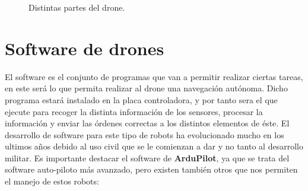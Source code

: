 \begin{figure}[H]
 \centering
 \caption{Distintas partes del drone.}
 \label{f:Test 1}
\end{figure} 


\section{Software de drones}
\hspace{1 cm} El software es el conjunto de programas que van a permitir realizar ciertas tareas, en este ser\'a lo que permita realizar al drone una navegaci\'on aut\'onoma. Dicho programa estar\'a instalado en la placa controladora, y por tanto sera el que ejecute para recoger la distinta informaci\'on de los sensores, procesar la informaci\'on y enviar las \'ordenes correctas a los distintos elementos de \'este. El desarrollo de software para este tipo de robots ha evolucionado mucho en los ultimos años debido al uso civil que se le comienzan a dar y no tanto al desarrollo militar. Es importante destacar el software de \textbf{ArduPilot}, ya que se trata del software auto-piloto m\'as avanzado, pero existen tambi\'en otros que nos permiten el manejo de estos robots:

